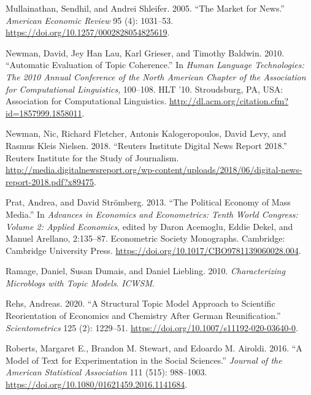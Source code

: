 \documentclass[
  12pt,
]{article}
\newlength{\cslhangindent}
\newlength{\cslentryspacingunit} %
\newenvironment{CSLReferences}[2] %
 {%
  \setlength{\parindent}{0pt}
  \ifodd #1
  \let\oldpar\par
  \def\par{\hangindent=\cslhangindent\oldpar}
  \fi
  \setlength{\parskip}{#2\cslentryspacingunit}
 }%
 {}
\begin{document}
\begin{CSLReferences}{1}{0}
\leavevmode{}%
Mullainathan, Sendhil, and Andrei Shleifer. 2005. {``The {Market} for
{News}.''} \emph{American Economic Review} 95 (4): 1031--53.
\url{https://doi.org/10.1257/0002828054825619}.

\leavevmode{}%
Newman, David, Jey Han Lau, Karl Grieser, and Timothy Baldwin. 2010.
{``Automatic {Evaluation} of {Topic Coherence}.''} In \emph{Human
{Language Technologies}: {The} 2010 {Annual Conference} of the {North
American Chapter} of the {Association} for {Computational Linguistics}},
100--108. {HLT} '10. {Stroudsburg, PA, USA}: {Association for
Computational Linguistics}.
\url{http://dl.acm.org/citation.cfm?id=1857999.1858011}.

\leavevmode{}%
Newman, Nic, Richard Fletcher, Antonis Kalogeropoulos, David Levy, and
Rasmus Kleis Nielsen. 2018. {``Reuters {Institute Digital News Report}
2018.''} {Reuters Institute for the Study of Journalism}.
\url{http://media.digitalnewsreport.org/wp-content/uploads/2018/06/digital-news-report-2018.pdf?x89475}.

\leavevmode{}%
Prat, Andrea, and David Strömberg. 2013. {``The {Political Economy} of
{Mass Media}.''} In \emph{Advances in {Economics} and {Econometrics}:
{Tenth World Congress}: {Volume} 2: {Applied Economics}}, edited by
Daron Acemoglu, Eddie Dekel, and Manuel Arellano, 2:135--87. Econometric
{Society Monographs}. {Cambridge}: {Cambridge University Press}.
\url{https://doi.org/10.1017/CBO9781139060028.004}.

\leavevmode{}%
Ramage, Daniel, Susan Dumais, and Daniel Liebling. 2010.
\emph{Characterizing {Microblogs} with {Topic Models}}. \emph{ICWSM}.

\leavevmode{}%
Rehs, Andreas. 2020. {``A Structural Topic Model Approach to Scientific
Reorientation of Economics and Chemistry After {German}
Reunification.''} \emph{Scientometrics} 125 (2): 1229--51.
\url{https://doi.org/10.1007/s11192-020-03640-0}.

\leavevmode{}%
Roberts, Margaret E., Brandon M. Stewart, and Edoardo M. Airoldi. 2016.
{``A {Model} of {Text} for {Experimentation} in the {Social
Sciences}.''} \emph{Journal of the American Statistical Association} 111
(515): 988--1003. \url{https://doi.org/10.1080/01621459.2016.1141684}.


\end{CSLReferences}
\end{document}
